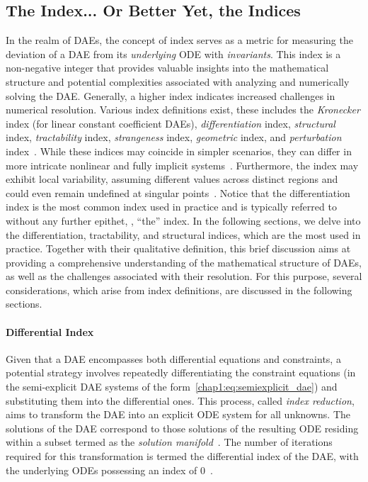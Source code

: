 \subsection{The Index... Or Better Yet, the Indices}

In the realm of \acp{DAE}, the concept of index serves as a metric for measuring the deviation of a \ac{DAE} from its \emph{underlying} \ac{ODE} with \emph{invariants}. This index is a non-negative integer that provides valuable insights into the mathematical structure and potential complexities associated with analyzing and numerically solving the \ac{DAE}. Generally, a higher index indicates increased challenges in numerical resolution. Various index definitions exist, these includes the \emph{Kronecker} index (for linear constant coefficient \acp{DAE}), \emph{differentiation} index, \emph{structural} index, \emph{tractability} index, \emph{strangeness} index, \emph{geometric} index, and \emph{perturbation} index~\cite{mehrmann2015index}. While these indices may coincide in simpler scenarios, they can differ in more intricate nonlinear and fully implicit systems~\cite{lamour2012detecting}. Furthermore, the index may exhibit local variability, assuming different values across distinct regions and could even remain undefined at singular points~\cite{lamour2012detecting}. Notice that the differentiation index is the most common index used in practice and is typically referred to without any further epithet, \ie{}, ``the'' index. In the following sections, we delve into the differentiation, tractability, and structural indices, which are the most used in practice. Together with their qualitative definition, this brief discussion aims at providing a comprehensive understanding of the mathematical structure of \acp{DAE}, as well as the challenges associated with their resolution. For this purpose, several considerations, which arise from index definitions, are discussed in the following sections.

\paragraph{Differential Index}

Given that a \ac{DAE} encompasses both differential equations and constraints, a potential strategy involves repeatedly differentiating the constraint equations (in the semi-explicit \ac{DAE} systems of the form~\eqref{chap1:eq:semiexplicit_dae}) and substituting them into the differential ones. This process, called \emph{index reduction}, aims to transform the \ac{DAE} into an explicit \ac{ODE} system for all unknowns. The solutions of the \ac{DAE} correspond to those solutions of the resulting \ac{ODE} residing within a subset termed as the \emph{solution manifold}~\cite{rheinboldt1984differential}. The number of iterations required for this transformation is termed the differential index of the \ac{DAE}, with the underlying \acp{ODE} possessing an index of 0~\cite{mehrmann2015index}.

